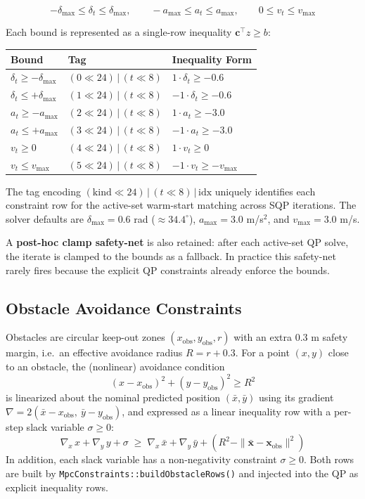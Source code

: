 ﻿\documentclass[11pt,a4paper]{article}
\begin{document}
\begin{equation}
-\delta_{\max} \leq \delta_t \leq \delta_{\max}, \qquad
-a_{\max} \leq a_t \leq a_{\max}, \qquad
0 \leq v_t \leq v_{\max}
\end{equation}

Each bound is represented as a single-row inequality $\mathbf{c}^\top z \geq b$:

\begin{center}
\begin{tabular}{@{}llp{6.5cm}@{}}
\toprule
Bound & Tag & Inequality Form \\
\midrule
$\delta_t \geq -\delta_{\max}$ & $(0 \ll 24) \,|\, (t \ll 8)$ & $1 \cdot \delta_t \geq -0.6$ \\
$\delta_t \leq +\delta_{\max}$ & $(1 \ll 24) \,|\, (t \ll 8)$ & $-1 \cdot \delta_t \geq -0.6$ \\
$a_t \geq -a_{\max}$ & $(2 \ll 24) \,|\, (t \ll 8)$ & $1 \cdot a_t \geq -3.0$ \\
$a_t \leq +a_{\max}$ & $(3 \ll 24) \,|\, (t \ll 8)$ & $-1 \cdot a_t \geq -3.0$ \\
$v_t \geq 0$ & $(4 \ll 24) \,|\, (t \ll 8)$ & $1 \cdot v_t \geq 0$ \\
$v_t \leq v_{\max}$ & $(5 \ll 24) \,|\, (t \ll 8)$ & $-1 \cdot v_t \geq -v_{\max}$ \\
\bottomrule
\end{tabular}
\end{center}

The tag encoding $(\text{kind} \ll 24) \,|\, (t \ll 8) \,|\, \text{idx}$ uniquely identifies each constraint row for the active-set warm-start matching across SQP iterations. The solver defaults are $\delta_{\max} = 0.6$ rad ($\approx 34.4^\circ$), $a_{\max} = 3.0$ m/s$^2$, and $v_{\max} = 3.0$ m/s.

A \textbf{post-hoc clamp safety-net} is also retained: after each active-set QP solve, the iterate is clamped to the bounds as a fallback. In practice this safety-net rarely fires because the explicit QP constraints already enforce the bounds.
\subsection{Obstacle Avoidance Constraints}
Obstacles are circular keep-out zones $(x_{\text{obs}}, y_{\text{obs}}, r)$ with an extra $0.3$ m safety margin, i.e.\ an effective avoidance radius $R = r + 0.3$. For a point $(x,y)$ close to an obstacle, the (nonlinear) avoidance condition
\[
(x-x_{\text{obs}})^2 + (y-y_{\text{obs}})^2 \geq R^2
\]
is linearized about the nominal predicted position $(\bar x,\bar y)$ using its gradient $\nabla = 2(\bar x - x_{\text{obs}},\ \bar y - y_{\text{obs}})$, and expressed as a linear inequality row with a per-step slack variable $\sigma \geq 0$:
\begin{equation}
\nabla_x \, x + \nabla_y \, y + \sigma \;\geq\; \nabla_x\, \bar x + \nabla_y\, \bar y + (R^2 - \|\bar{\mathbf{x}} - \mathbf{x}_{\text{obs}}\|^2)
\end{equation}
In addition, each slack variable has a non-negativity constraint $\sigma \geq 0$. Both rows are built by \texttt{MpcConstraints::buildObstacleRows()} and injected into the QP as explicit inequality rows.
\end{document}
